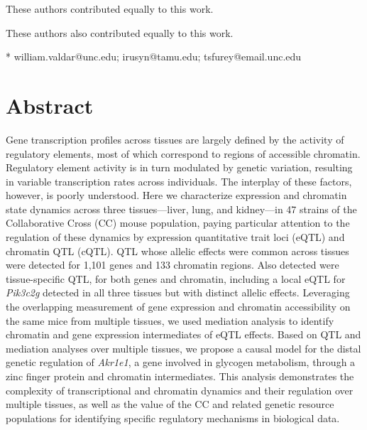 \documentclass[10pt,letterpaper]{article}
\begin{document}
\begin{flushleft}
% 
%
\Yinyang These authors contributed equally to this work.

\ddag These authors also contributed equally to this work.




* william.valdar@unc.edu; irusyn@tamu.edu; tsfurey@email.unc.edu

\end{flushleft}
\section*{Abstract}
Gene transcription profiles across tissues are largely defined by the activity of regulatory elements, most of which correspond to regions of accessible chromatin. Regulatory element activity is in turn modulated by genetic variation, resulting in variable transcription rates across individuals. The interplay of these factors, however, is poorly understood.
Here we characterize expression and chromatin state dynamics across three tissues---liver, lung, and kidney---in 47 strains of the 
Collaborative Cross (CC) mouse population, paying particular attention to the regulation of these dynamics by expression quantitative trait loci (eQTL) and chromatin QTL (cQTL). 
QTL whose allelic effects were common across tissues were detected for 1,101 genes and 133 chromatin regions.
Also detected were tissue-specific QTL, for both genes and chromatin, including a local eQTL for \textit{Pik3c2g} detected in all three tissues but with distinct allelic effects.
Leveraging the overlapping measurement of gene expression and chromatin accessibility on the same mice from multiple tissues, we used mediation analysis to identify chromatin and gene expression intermediates of eQTL effects. 
Based on QTL and mediation analyses over multiple tissues, we propose a causal model for the distal genetic regulation of \textit{Akr1e1}, a gene involved in glycogen metabolism, through a zinc finger protein and chromatin intermediates.
This analysis demonstrates the complexity of transcriptional and chromatin dynamics and their regulation over multiple tissues, as well as the value of the CC and related genetic resource populations for identifying specific regulatory mechanisms in biological data.
\end{document}
